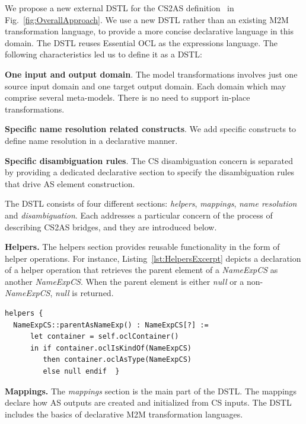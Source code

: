 \documentclass{llncs}
\begin{document}
We propose a new external DSTL for the CS2AS definition~ in Fig.~\ref{fig:OverallApproach}. We use a new DSTL rather than an existing M2M transformation language, to provide a more concise declarative language in this domain. The DSTL reuses Essential OCL as the expressions language. The following characteristics led us to define it as a DSTL:

\textbf{One input and output domain}. The model transformations involves just one source input domain and one target output domain. Each domain which may comprise several meta-models. There is no need to support in-place transformations.

\textbf{Specific name resolution related constructs}. We add specific constructs to define name resolution in a declarative manner.

\textbf{Specific disambiguation rules}. The CS disambiguation concern is separated by providing a dedicated declarative section to specify the disambiguation rules that drive AS element construction.



The DSTL consists of four different sections: \textit{helpers}, \textit{mappings}, \textit{name resolution} and \textit{disambiguation}. Each addresses a particular concern of the process of describing CS2AS bridges, and they are introduced below.

\textbf{Helpers.}
The helpers section provides reusable functionality in the form of helper operations. For instance, Listing~\ref{lst:HelpersExcerpt} depicts a declaration of a helper operation that retrieves the parent element of a \textit{NameExpCS} as another \textit{NameExpCS}. When the parent element is either \textit{null} or a non-\textit{NameExpCS}, \textit{null} is returned.

\begin{lstlisting}[caption=Helpers section excerpt, label=lst:HelpersExcerpt, language=CS2AS]
helpers {
  NameExpCS::parentAsNameExp() : NameExpCS[?] := 
      let container = self.oclContainer()
      in if container.oclIsKindOf(NameExpCS)
         then container.oclAsType(NameExpCS)
         else null endif  }
\end{lstlisting} 

\textbf{Mappings.}
The \textit{mappings} section is the main part of the DSTL. The mappings declare how AS outputs are created and initialized from CS inputs. The DSTL includes the basics of declarative M2M transformation languages\cite{czarnecki2003classification}.
\end{document}
